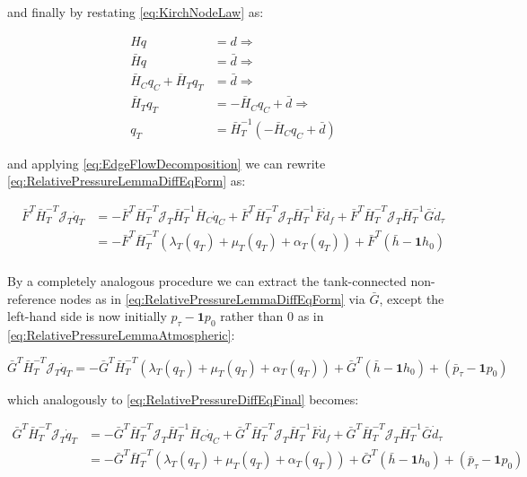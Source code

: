 and finally by restating \cref{eq:KirchNodeLaw} as:

\begin{equation}\label{eq:MassConservationPartitioned}
	\begin{split}
	H q &= d \Rightarrow \\  
	\bar{H}q &= \bar{d} \Rightarrow \\
	\bar{H}_C q_C + \bar{H}_T q_T &= \bar{d} \Rightarrow \\
	\bar{H}_T q_T &= -\bar{H}_C q_C + \bar{d} \Rightarrow	\\
	q_T &= \bar{H}_T^{-1}(-\bar{H}_C q_C + \bar{d})
	\end{split}
\end{equation}

and applying \cref{eq:EdgeFlowDecomposition} we can rewrite \cref{eq:RelativePressureLemmaDiffEqForm} as:

\begin{equation}\label{eq:RelativePressureDiffEqFinal}
	\begin{split}
	\bar{F}^T\bar{H}_T^{-T}\mathcal{J}_T\dot{q}_T &= 
	-\bar{F}^T\bar{H}_T^{-T}\mathcal{J}_T\bar{H}_T^{-1}\bar{H}_C\dot{q}_C + \bar{F}^T\bar{H}_T^{-T}\mathcal{J}_T\bar{H}_T^{-1}\bar{F}\dot{d}_f + \bar{F}^T\bar{H}_T^{-T}\mathcal{J}_T\bar{H}_T^{-1}\bar{G}\dot{d}_{\tau} \\
	&= -\bar{F}^T\bar{H}_T^{-T}(\lambda_T(q_T)+\mu_T(q_T) + \alpha_T(q_T)) + 
	\bar{F}^T(\bar{h} - \mathbf{1}h_0) \\	
	\end{split}
\end{equation}

By a completely analogous procedure we can extract the tank-connected non-reference nodes as in \cref{eq:RelativePressureLemmaDiffEqForm} via $\bar{G}$, except the left-hand side is now initially $p_{\tau}-\mathbf{1}p_0$ rather than 0 as in \cref{eq:RelativePressureLemmaAtmospheric}:

\begin{equation}\label{eq:RelativePressureLemmaDiffEqFormG}
	\bar{G}^T\bar{H}_T^{-T}\mathcal{J}_T\dot{q}_T = - 	\bar{G}^T\bar{H}_T^{-T}(\lambda_T(q_T)+\mu_T(q_T) + \alpha_T(q_T)) +
	\bar{G}^T(\bar{h} - \mathbf{1}h_0) +
	(\bar{p}_\tau - \mathbf{1}p_0)
\end{equation}

which analogously to \cref{eq:RelativePressureDiffEqFinal} becomes:

\begin{equation}\label{eq:RelativePressureDiffEqFinalG}
	\begin{split}
		\bar{G}^T\bar{H}_T^{-T}\mathcal{J}_T\dot{q}_T &= 
		-\bar{G}^T\bar{H}_T^{-T}\mathcal{J}_T\bar{H}_T^{-1}\bar{H}_C\dot{q}_C + \bar{G}^T\bar{H}_T^{-T}\mathcal{J}_T\bar{H}_T^{-1}\bar{F}\dot{d}_f + \bar{G}^T\bar{H}_T^{-T}\mathcal{J}_T\bar{H}_T^{-1}\bar{G}\dot{d}_{\tau} \\
		&= -\bar{G}^T\bar{H}_T^{-T}(\lambda_T(q_T)+\mu_T(q_T) + \alpha_T(q_T)) + 
		\bar{G}^T(\bar{h} - \mathbf{1}h_0) +
		(\bar{p}_\tau - \mathbf{1}p_0) \\	
	\end{split}
\end{equation}

